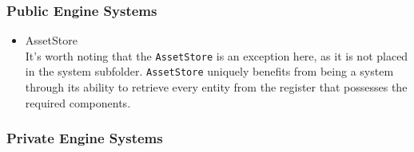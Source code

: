 \subsubsection{Public Engine Systems}
\begin{itemize}
    \item AssetStore\\
    It's worth noting that the \texttt{AssetStore} is an exception here, as it is not placed in the system subfolder. \texttt{AssetStore} uniquely benefits from being a system through its ability to retrieve every entity from the register that possesses the required components.
\end{itemize}

\subsubsection{Private Engine Systems}
